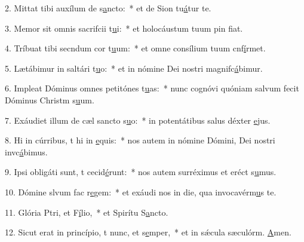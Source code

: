 2. Mittat tibi auxílum de s\uline{a}ncto:~* et de Sion tu\uline{á}tur te.\par 
3. Memor sit omnis sacrifcii t\uline{u}i:~* et holocáustum tuum pin f\uline{i}at.\par 
4. Tríbuat tibi secndum cor t\uline{u}um:~* et omne consílium tuum cnf\uline{í}rmet.\par 
5. Lætábimur in saltári t\uline{u}o:~* et in nómine Dei nostri magnifc\uline{á}bimur.\par 
6. Impleat Dóminus omnes petitónes t\uline{u}as:~* nunc cognóvi quóniam salvum fecit Dóminus Christm s\uline{u}um.\par 
7. Exáudiet illum de cæl sancto s\uline{u}o:~* in potentátibus salus déxter \uline{e}jus.\par 
8. Hi in cúrribus, t hi in \uline{e}quis:~* nos autem in nómine Dómini, Dei nostri invc\uline{á}bimus.\par 
9. Ipsi obligáti sunt, t cecid\uline{é}runt:~* nos autem surréximus et eréct s\uline{u}mus.\par 
10. Dómine slvum fac r\uline{e}gem:~* et exáudi nos in die, qua invocavérm\uline{u}s te.\par 
11. Glória Ptri, et F\uline{í}lio,~* et Spirítu S\uline{a}ncto.\par 
12. Sicut erat in princípio, t nunc, et s\uline{e}mper,~* et in sǽcula sæculórm. \uline{A}men.\par 
